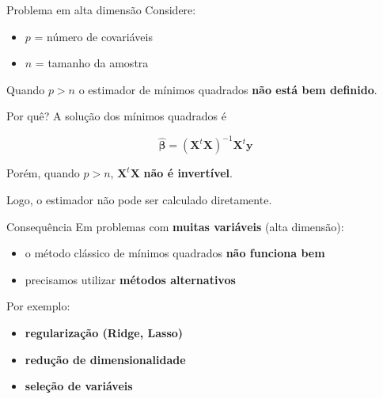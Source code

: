 \documentclass[
  ignorenonframetext,
  aspectratio=169,
]{beamer}
\providecommand{\tightlist}{%
  \setlength{\itemsep}{0pt}\setlength{\parskip}{0pt}}
\begin{document}
\begin{frame}
\begin{block}{Problema em alta dimensão}
\label{problema-em-alta-dimensuxe3o}
Considere:

\begin{itemize}
\tightlist
\item
  \(p\) = número de covariáveis\\
\item
  \(n\) = tamanho da amostra
\end{itemize}

Quando \(p > n\) o estimador de mínimos quadrados \textbf{não está bem
definido}.
\end{block}
\end{frame}

\begin{frame}
\begin{block}{Por quê?}
\label{por-quuxea}
A solução dos mínimos quadrados é

\[
\hat{\boldsymbol{\beta}} = (\boldsymbol{X}^t \boldsymbol{X})^{-1} \boldsymbol{X}^t \boldsymbol{y}
\]

Porém, quando \(p > n\), \(\boldsymbol{X}^t \boldsymbol{X}\) \textbf{não
é invertível}.

Logo, o estimador não pode ser calculado diretamente.
\end{block}
\end{frame}

\begin{frame}
\begin{block}{Consequência}
\label{consequuxeancia}
Em problemas com \textbf{muitas variáveis} (alta dimensão):

\begin{itemize}
\tightlist
\item
  o método clássico de mínimos quadrados \textbf{não funciona bem}
\item
  precisamos utilizar \textbf{métodos alternativos}
\end{itemize}

Por exemplo:

\begin{itemize}
\tightlist
\item
  \textbf{regularização (Ridge, Lasso)}
\item
  \textbf{redução de dimensionalidade}
\item
  \textbf{seleção de variáveis}
\end{itemize}
\end{block}
\end{frame}
\end{document}
